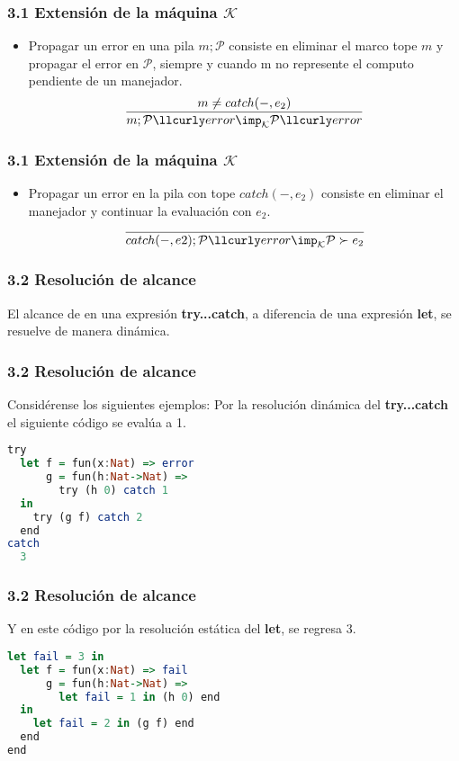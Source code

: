 \documentclass[xcolor=dvipsnames,table,spanish]{beamer}
\begin{document}
\begin{frame}
\frametitle{3.1 Extensión de la máquina $\mathcal{K}$}
\begin{itemize}
		\item Propagar un error en una pila $m;\mathcal{P}$  consiste en eliminar el marco tope $m$ y propagar el error
en $\mathcal{P}$, siempre y cuando m no represente el computo pendiente de un manejador.
        \[ \frac{m \neq catch(-,e_2)}{m;\mathcal{P} \llcurly error \imp_{\mathcal{K}} \mathcal{P} \llcurly error} \]
\end{itemize}
\end{frame}

\begin{frame}
\frametitle{3.1 Extensión de la máquina $\mathcal{K}$}
\begin{itemize}
		\item Propagar un error en la pila con tope $catch(-,e_2)$ consiste en eliminar el manejador y continuar la evaluación con $e_2$.
        \[ \frac{}{catch(-,e2);\mathcal{P} \llcurly error \imp_{\mathcal{K}} \mathcal{P} \succ e_2} \]
\end{itemize}
\end{frame}

\begin{frame}
\frametitle{3.2 Resolución de alcance}
El alcance de en una expresión \textbf{try...catch}, a diferencia de una expresión \textbf{let}, se resuelve de manera dinámica.

\end{frame}

\begin{frame}[fragile]
\frametitle{3.2 Resolución de alcance}
Considérense los siguientes ejemplos:\newline
Por la  resolución dinámica del \textbf{try...catch} el siguiente código se evalúa a 1.
\begin{example}
\begin{lstlisting}[language=Haskell]
try
  let f = fun(x:Nat) => error
      g = fun(h:Nat->Nat) =>
      	try (h 0) catch 1
  in
    try (g f) catch 2
  end
catch
  3

\end{lstlisting}
\end{example}
\end{frame}

\begin{frame}[fragile]
\frametitle{3.2 Resolución de alcance}
Y en este código por la resolución estática del \textbf{let}, se regresa 3.
\begin{example}
\begin{lstlisting}[language=Haskell]
let fail = 3 in
  let f = fun(x:Nat) => fail
      g = fun(h:Nat->Nat) =>
      	let fail = 1 in (h 0) end
  in
    let fail = 2 in (g f) end
  end
end

\end{lstlisting}
\end{example}
\end{frame}
\end{document}
